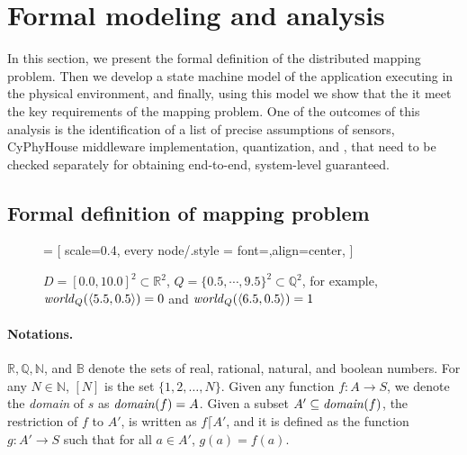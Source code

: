 \section{Formal modeling and analysis}
\label{sec:formal}
In this section, we present the formal definition of the distributed mapping problem. Then we develop a state machine model of the \dmap application executing in the physical environment, and finally, using this model we show that the it meet the key requirements of the mapping problem. One of the outcomes of this analysis is the identification of a list of precise
 assumptions of sensors, CyPhyHouse middleware implementation, quantization, and , that need to be checked separately for obtaining end-to-end, system-level guaranteed.

\subsection{Formal definition of mapping problem}
\label{sec:prelims}

\begin{figure*}[t]
\newcommand{\grid}[2]{\ensuremath{\langle#1,#2\rangle}}

 = [
scale=0.4,
every node/.style = {font=\scriptsize,align=center},
]




\caption{$D = [0.0,10.0]^2 \subset \mathbb{R}^2$, $Q=\{0.5, \cdots, 9.5\}^2 \subset \mathbb{Q}^2$, for example, $\world_Q(\grid{5.5}{0.5}) = 0$ and $\world_Q(\grid{6.5}{0.5}) = 1$}
\end{figure*}

\paragraph{Notations.}
$\mathbb{R}, \mathbb{Q},\mathbb{N}$, and $\mathbb{B}$ denote the sets of real, rational, natural, and boolean numbers.
For any $N \in \mathbb{N}$, $[N]$ is the set $\{1,2,\ldots,N\}$.
%
Given any function $f:A \rightarrow S$, we denote the {\em domain\/} of $s$ as $\mathit{domain}(f) = A$.
%
Given a subset $A' \subseteq \mathit{domain}(f)$,
    the restriction of $f$ to $A'$, is written as $f \lceil A'$, and it is defined as the function $g:A' \rightarrow S$ such that for all $a \in A'$, $g(a) = f(a)$.

